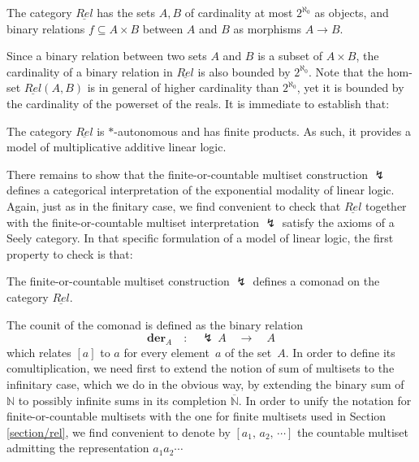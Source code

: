\documentclass[runningheads,a4paper]{llncs}
\newcommand{\superbang}{\lightning} \newcommand{\modality}{\Box}
\newcommand{\Relinfinitary}{\underline{Rel}}
\newcommand{\der}[1]{\mathbf{der}_{#1}}
\newcommand{\cardreals}{2^{\aleph_0}}
\begin{document}
\begin{definition}
The category $\Relinfinitary$ has the sets $A,B$ of cardinality at most
$\cardreals$ as objects, and binary relations $f\subseteq A\times B$
between $A$ and $B$ as morphisms $A\to B$.
\end{definition}
Since a binary relation between two sets $A$ and $B$ is a subset of $A\times B$,
the cardinality of a binary relation in $\Relinfinitary$ is also bounded by $\cardreals$.
Note that the hom-set $\Relinfinitary(A,B)$ is in general of higher cardinality than $\cardreals$,
yet it is bounded by the cardinality of the powerset of the reals.
It is immediate to establish that:
\begin{property}
The category $\Relinfinitary$ is $\ast$-autonomous and has finite products.
As such, it provides a model of multiplicative additive linear logic.
\end{property}
There remains to show that the finite-or-countable multiset construction $\superbang$
defines a categorical interpretation of the exponential modality of linear logic.
Again, just as in the finitary case, we find convenient to check that $\Relinfinitary$ together 
with the finite-or-countable multiset interpretation $\superbang$ satisfy the axioms of a Seely category.
In that specific formulation of a model of linear logic, the first property to check is that:
\begin{property}
The finite-or-countable multiset construction $\superbang$ defines 
a comonad on the category $\Relinfinitary$.
\end{property}
The counit of the comonad is defined as the binary relation
$$
\der{A} \quad : \quad \superbang \, A \quad \longrightarrow \quad A
$$
which relates $[a]$ to $a$ for every element~$a$ of the set~$A$. 
In order to define its comultiplication, we need first to extend the notion of sum 
of multisets to the infinitary case, which we do in the obvious way, by extending
the binary sum of~$\mathbb{N}$ to possibly infinite sums in its completion $\overline{\mathbb{N}}$.
In order to unify the notation for finite-or-countable multisets with the one for finite multisets used in Section \ref{section/rel}, 
we find convenient to denote by $[a_1,\,a_2,\,\cdots]$ the countable multiset admitting the representation $a_1 a_2 \cdots$
\end{document}

